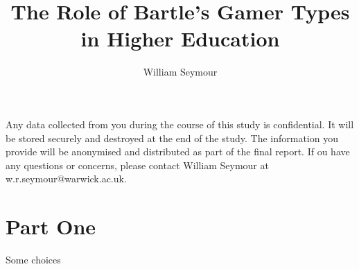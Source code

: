 \documentclass[english,pdf,pagemark,stamp,globalid=\candidateID]{sdaps}
\author{William Seymour}
\title{The Role of Bartle's Gamer Types in Higher Education}
\begin{document}
  \begin{questionnaire}
    \begin{info}
      Any data collected from you during the course of this study is confidential. It will be stored securely and destroyed at the end of the study. The information you provide will be anonymised and distributed as part of the final report. If ou have any questions or concerns, please contact William Seymour at w.r.seymour@warwick.ac.uk.
    \end{info}

    \section{Part One}

    \begin{choicequestion}[4]{Some choices}
    \end{choicequestion}

  \end{questionnaire}
\end{document}
